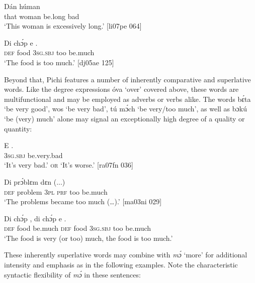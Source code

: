 \ea%
    \label{ex:key:496}
    \gll Dán    húman      \\
that    woman  be.long  bad\\

\glt ‘This woman is excessively long.’ [li07pe 064]
\z


\ea%
    \label{ex:key:497}
    \gll Di  chɔ́p  e      .\\
\textsc{def}  food    \textsc{3sg.sbj}  too  be.much\\

\glt ‘The food is too much.’ [dj05ae 125]
\z

Beyond that, Pichi features a number of inherently comparative and superlative words. Like the degree expressions óva ‘over’ covered above, these words are multifunctional and may be employed as adverbs or verbs alike. The words bɛ́ta ‘be very good’, wos ‘be very bad’, tú mɔ́ch ‘be very/too much’, as well as bɔkú ‘be (very) much’ alone may signal an exceptionally high degree of a quality or quantity: 


\ea%
    \label{ex:key:498}
    \gll E    .\\
\textsc{3sg.sbj}  be.very.bad\\

\glt ‘It’s very bad.’ \textsc{or} ‘It’s worse.’ [ra07fn 036]
\z


\ea%
    \label{ex:key:499}
    \gll Di  prɔ́blɛm  dɛn        (...)\\
\textsc{def}  problem  3\textsc{pl}  \textsc{prf}  too  be.much\\

\glt ‘The problems became too much (…).’ [ma03ni 029]
\z


\ea%
    \label{ex:key:500}
    \gll Di  chɔ́p  ,  di  chɔ́p  e      .\\
\textsc{def}  food    be.much  \textsc{def}  food    \textsc{3sg.sbj}  too  be.much\\
\glt ‘The food is very (or too) much, the food is too much.’
\z

These inherently superlative words may combine with \textit{mɔ́} ‘more’ for additional intensity and emphasis as in the following examples. Note the characteristic syntactic flexibility of \textit{mɔ́} in these sentences: 


